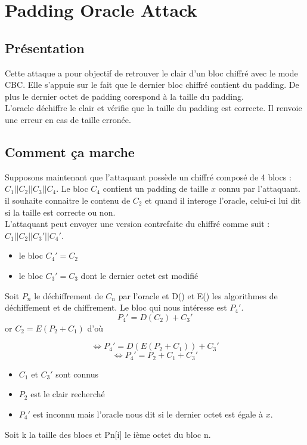 
\chapter{Padding Oracle Attack}
\label{chapter:poa}

\section{Présentation}
\label{sec:pPOA}

Cette attaque a pour objectif de retrouver le clair d'un bloc chiffré 
avec le mode CBC\up{\ref{fig:cbc}}. Elle s'appuie sur le fait que le dernier bloc chiffré
contient du padding. De plus le dernier octet de padding corespond à la
taille du padding.\\
L'oracle  déchiffre le clair et vérifie que la taille du padding est correcte. 
Il renvoie une erreur en cas de taille erronée.\\

\section{Comment ça marche}
\label{sec:ccmPOA}

Supposons maintenant que l'attaquant possède un chiffré composé de 4 blocs :
$C_1||C_2||C_3||C_4$. Le bloc $C_4$ contient un padding de taille $x$ connu par l'attaquant.
il souhaite connaitre le contenu de $C_2$ et quand il interoge l'oracle, celui-ci lui dit
si la taille est correcte ou non.\\
L'attaquant peut envoyer une version contrefaite du chiffré comme suit :
$C_1||C_2||C_3'||C_4'$.\\
\begin{itemize}
\item le bloc $C_4'=C_2$
\item le bloc $C_3'= C_3$ dont le dernier octet est modifié
\end{itemize}
Soit $P_n$ le déchiffrement de $C_n$ par l'oracle et D() et E() les algorithmes
de déchiffement et de chiffrement. 
Le bloc qui nous intéresse est $P_4'$.
\[P_4' = D(C_2) + C_3'\]
or $C_2 = E(P_2 + C_1)$ d'où

\[\Longleftrightarrow P_4' = D(E(P_2 + C_1)) + C_3'\]
\[\Longleftrightarrow P_4' = P_2 + C_1 + C_3'\]
\begin{itemize}
\item $C_1$ et $C_3'$ sont connus
\item $P_2$ est le clair recherché
\item $P_4'$ est inconnu mais l'oracle nous dit si le dernier octet est égale à $x$.
\end{itemize}
Soit k la taille des blocs et Pn[i] le ième octet du bloc n.


